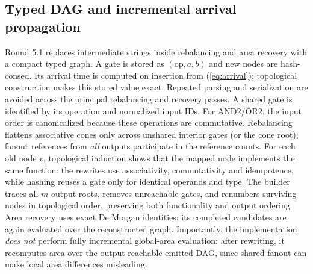 \documentclass[journal,10pt]{IEEEtran}
\begin{document}
\subsection{Typed DAG and incremental arrival propagation}
Round 5.1 replaces intermediate strings inside rebalancing and area recovery with a compact typed graph. A gate is stored as $(\mathrm{op},a,b)$ and new nodes are hash-consed. Its arrival time is computed on insertion from (\ref{eq:arrival}); topological construction makes this stored value exact. Repeated parsing and serialization are avoided across the principal rebalancing and recovery passes. A shared gate is identified by its operation and normalized input IDs. For AND2/OR2, the input order is canonicalized because these operations are commutative. Rebalancing flattens associative cones only across unshared interior gates (or the cone root); fanout references from \emph{all} outputs participate in the reference counts. For each old node $v$, topological induction shows that the mapped node implements the same function: the rewrites use associativity, commutativity and idempotence, while hashing reuses a gate only for identical operands and type. The builder traces all $m$ output roots, removes unreachable gates, and renumbers surviving nodes in topological order, preserving both functionality and output ordering. Area recovery uses exact De Morgan identities; its completed candidates are again evaluated over the reconstructed graph. Importantly, the implementation \emph{does not} perform fully incremental global-area evaluation: after rewriting, it recomputes area over the output-reachable emitted DAG, since shared fanout can make local area differences misleading.
\end{document}
